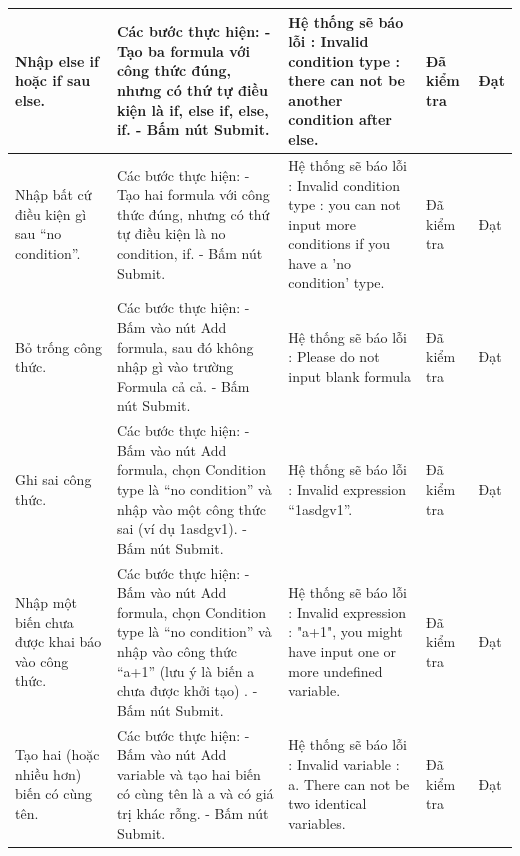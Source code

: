 \documentclass[a4paper]{article}
\begin{document}
\begin{longtable}{ | p{} |p{} | p{}  | p{}  | p{}  | }
\hline
Nhập else if hoặc if sau else. &
Các bước thực hiện: \newline
- Tạo ba formula với công thức đúng, nhưng có thứ tự điều kiện là if, else if, else, if. \newline
- Bấm nút Submit.
&
Hệ thống sẽ báo lỗi : Invalid condition type : there can not be another condition after else.
&
Đã kiểm tra &
Đạt \\

\hline
Nhập bất cứ điều kiện gì sau “no condition”. &
Các bước thực hiện: \newline
- Tạo hai formula với công thức đúng, nhưng có thứ tự điều kiện là no condition, if.\newline
- Bấm nút Submit.
&
Hệ thống sẽ báo lỗi : Invalid condition type : you can not input more conditions if you have a 'no condition' type.
&
Đã kiểm tra &
Đạt \\

\hline
Bỏ trống công thức. &
Các bước thực hiện: \newline
- Bấm vào nút Add formula, sau đó không nhập gì vào trường Formula cả cả. \newline
- Bấm nút Submit.  
&
Hệ thống sẽ báo lỗi : Please do not input blank formula
&
Đã kiểm tra &
Đạt \\

\hline
Ghi sai công thức. &
Các bước thực hiện: \newline
- Bấm vào nút Add formula, chọn Condition type là “no condition” và nhập vào một công thức sai (ví dụ 1asdgv1). \newline
- Bấm nút Submit.  
&
Hệ thống sẽ báo lỗi : Invalid expression “1asdgv1”.
&
Đã kiểm tra &
Đạt \\

\hline
Nhập một biến chưa được khai báo vào công thức. &
Các bước thực hiện: \newline
- Bấm vào nút Add formula, chọn Condition type là “no condition” và nhập vào công thức “a+1” (lưu ý là biến a chưa được khởi tạo) . \newline
- Bấm nút Submit.  
&
Hệ thống sẽ báo lỗi : Invalid expression : "a+1", you might have input one or more undefined variable.
&
Đã kiểm tra &
Đạt \\

\hline
Tạo hai (hoặc nhiều hơn) biến có cùng tên. &
Các bước thực hiện: \newline
- Bấm vào nút Add variable và tạo hai biến có cùng tên là a và có giá trị khác rỗng. \newline
- Bấm nút Submit.  
&
Hệ thống sẽ báo lỗi : Invalid variable : a. There can not be two identical variables.
&
Đã kiểm tra &
Đạt \\


\end{longtable}
\end{document}

